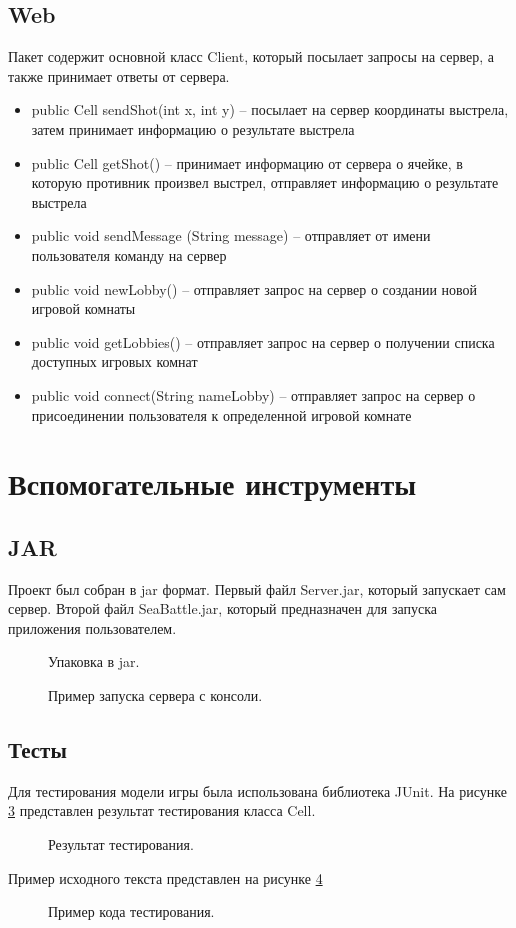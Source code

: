 \documentclass{article}
\begin{document}
			\subsection{Web}
				Пакет содержит основной класс Client, который посылает запросы на сервер, а также принимает ответы от сервера.
				\begin{itemize}
					\item {public Cell sendShot(int x, int y) -- посылает на сервер координаты выстрела, затем принимает информацию о результате выстрела}
					\item {public Cell getShot() -- принимает информацию от сервера о ячейке, в которую противник произвел выстрел, отправляет информацию о результате выстрела}
					\item {public void sendMessage (String message) -- отправляет от имени пользователя команду на сервер}
					\item {public void newLobby() -- отправляет запрос на сервер о создании новой игровой комнаты}
					\item {public void getLobbies() -- отправляет запрос на сервер о получении списка доступных игровых комнат}
					\item {public void connect(String nameLobby) -- отправляет запрос на сервер о присоединении пользователя к определенной игровой комнате}
				\end{itemize}
		\section{Вспомогательные инструменты}
			\subsection{JAR}
				Проект был собран в jar формат. Первый файл Server.jar, который запускает сам сервер. Второй файл SeaBattle.jar, который предназначен для запуска приложения пользователем.
				\begin{figure}[H]
					\caption{Упаковка в jar.\label{files}}
				\end{figure}
				\begin{figure}[H]
					\caption{Пример запуска сервера с консоли.\label{server}}
				\end{figure}
			\subsection{Тесты}
				Для тестирования модели игры была использована библиотека JUnit. На рисунке \ref{junit} представлен результат тестирования класса Cell.
				\begin{figure}[H]
					\caption{Результат тестирования.\label{junit}}
				\end{figure}
				Пример исходного текста представлен на рисунке \ref{code}
				\begin{figure}[H]
					\caption{Пример кода тестирования.\label{code}}
				\end{figure}
\end{document}
